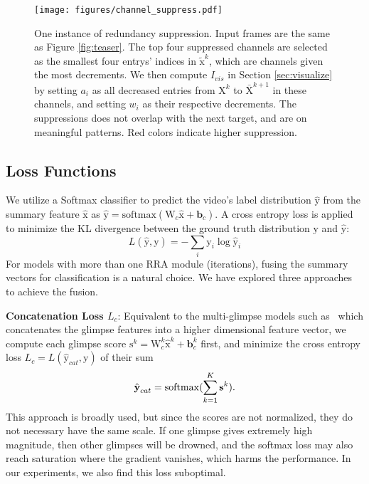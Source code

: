\documentclass[runningheads]{llncs}
\def\bsb{\boldsymbol{b}}
\def\x{\boldsymbol{\mathrm{x}}}
\def\s{\boldsymbol{\mathrm{s}}}
\def\X{\boldsymbol{\mathrm{X}}}
\def\y{\boldsymbol{\mathrm{y}}}
\def\W{\boldsymbol{\mathrm{W}}}
\begin{document}
\begin{figure}[t]
\centering
\texttt{[image: figures/channel\_suppress.pdf]}
\caption{One instance of redundancy suppression. Input frames are the same as Figure \ref{fig:teaser}. The top four suppressed channels are selected as the smallest four entrys' indices in $\tilde{\x}^k$, which are channels given the most decrements. We then compute $I_{vis}$ in Section \ref{sec:visualize} by setting $a_i$ as all decreased entries from $\X^k$ to $\bar{\X}^{k+1}$ in these channels, and setting $w_i$ as their respective decrements. The suppressions does not overlap with the next target, and are on meaningful patterns. Red colors indicate higher suppression. }
\label{fig:suppress}
\end{figure}

\subsection{Loss Functions}\label{sec:loss}
We utilize a Softmax classifier to predict the video's label distribution $\hat{\y}$ from the summary feature $\hat{\x}$ as $\hat{\y}=\mathrm{softmax}(\W_c\hat{\x}+\bsb_c)$. A cross entropy loss is applied to minimize the KL divergence between the ground truth distribution $\y$ and $\hat{\y}$:
\begin{equation}\label{eq:ce_loss}
L(\hat{\y}, \y) = -\sum_{i}\y_i\log \hat{\y}_i
\end{equation}
For models with more than one RRA module (iterations), fusing the summary vectors for classification is a natural choice. We have explored three approaches to achieve the fusion.

\textbf{Concatenation Loss $L_c$}: Equivalent to the multi-glimpse models such as~\cite{fukui2016multimodal} which concatenates the glimpse features into a higher dimensional feature vector, we compute each glimpse score $\s^k=\W_c^k\hat{\x}^k+\bsb_c^k$ first, and minimize the cross entropy loss $L_c=L(\hat{\y}_{cat}, \y)$ of their sum
\begin{equation}\label{eq:concat_loss}
\hat{\y}_{cat} = \mathrm{softmax}(\sum_{k=1}^{K} \s^k).\\
\end{equation}
This approach is broadly used, but since the scores are not normalized, they do not necessary have the same scale. If one glimpse gives extremely high magnitude, then other glimpses will be drowned, and the softmax loss may also reach saturation where the gradient vanishes, which harms the performance. In our experiments, we also find this loss suboptimal.
\end{document}
